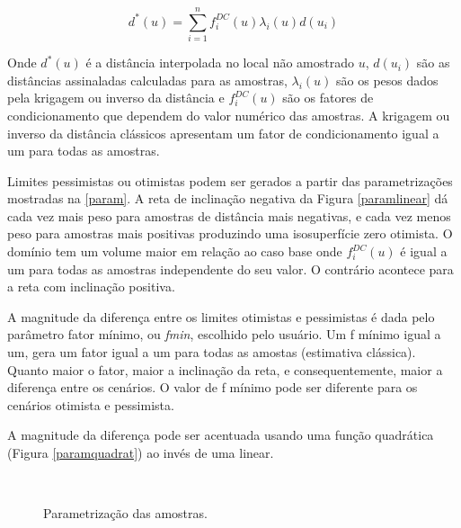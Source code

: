 \begin{equation}
\label{estimador_cond}
d^*(u)=\sum_{i=1}^{n} f^{DC}_i(u) \lambda_i(u) d(u_i)
\end{equation}

Onde $d^*(u)$ é a distância interpolada no local não amostrado $u$, $d(u_i)$ são as distâncias assinaladas calculadas para as amostras, $\lambda_i(u)$ são os pesos dados pela krigagem ou inverso da distância e $f^{DC}_i(u)$ são os fatores de condicionamento que dependem do valor numérico das amostras. A krigagem ou inverso da distância clássicos apresentam um fator de condicionamento igual a um para todas as amostras.

Limites pessimistas ou otimistas podem ser gerados a partir das parametrizações mostradas na \autoref{param}. A reta de inclinação negativa da Figura \autoref{paramlinear} dá cada vez mais peso para amostras de distância mais negativas, e cada vez menos peso para amostras mais positivas produzindo uma isosuperfície zero otimista. O domínio tem um volume maior em relação ao caso base onde $f^{DC}_i(u)$ é igual a um para todas as amostras independente do seu valor. O contrário acontece para a reta com inclinação positiva. 

A magnitude da diferença entre os limites otimistas e pessimistas é dada pelo parâmetro fator mínimo, ou \textit{fmin}, escolhido pelo usuário. Um f mínimo igual a um, gera um fator igual a um para todas as amostas (estimativa clássica). Quanto maior o fator, maior a inclinação da reta, e consequentemente, maior a diferença entre os cenários. O valor de f mínimo pode ser diferente para os cenários otimista e pessimista.

A magnitude da diferença pode ser acentuada usando uma função quadrática (Figura \autoref{paramquadrat}) ao invés de uma linear.

\begin{figure}[H] 
    \centering
    \caption{Parametrização das amostras.} \label{param}
      \\
\end{figure}

